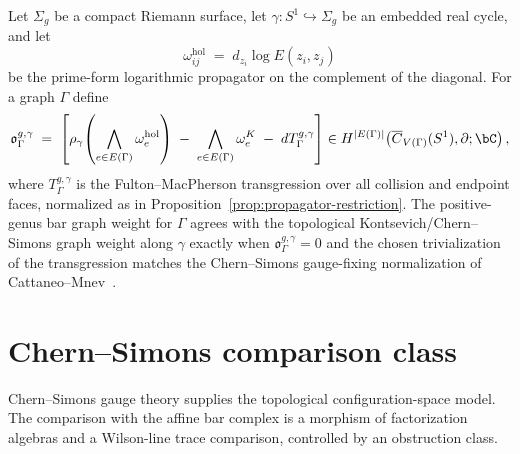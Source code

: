 \begin{definition}
\label{def:real-loop-obstruction}
\label{rem:holomorphic-to-topological}
Let $\Sigma_g$ be a compact Riemann surface, let
\(\gamma:S^1\hookrightarrow\Sigma_g\) be an embedded real cycle, and
let
\[
\omega^{\mathrm{hol}}_{ij}
\;=\;
d_{z_i}\log E(z_i,z_j)
\]
be the prime-form logarithmic propagator on the complement of the
diagonal.  For a graph $\Gamma$ define
\[
\mathfrak{o}^{g,\gamma}_\Gamma
\;=\;
\left[
\rho_\gamma\!\left(\bigwedge_{e\in E(\Gamma)}
\omega^{\mathrm{hol}}_e\right)
\;-\;
\bigwedge_{e\in E(\Gamma)}\omega^K_e
\;-\;dT^{g,\gamma}_\Gamma
\right]
\in
H^{|E(\Gamma)|}\!\left(
\overline{C}_{V(\Gamma)}(S^1),\partial;\bC\right),
\]
where $T^{g,\gamma}_\Gamma$ is the Fulton--MacPherson transgression
over all collision and endpoint faces, normalized as in
Proposition~\ref{prop:propagator-restriction}.  The positive-genus
bar graph weight for $\Gamma$ agrees with the topological
Kontsevich/Chern--Simons graph weight along $\gamma$ exactly when
\(\mathfrak{o}^{g,\gamma}_\Gamma=0\) and the chosen trivialization of
the transgression matches the Chern--Simons gauge-fixing
normalization of Cattaneo--Mnev~\cite{CattaneoMnev10}.
\end{definition}


\section{Chern--Simons comparison class}
\label{sec:cs-bridge}
Chern--Simons gauge theory supplies the topological configuration-space model.
The comparison with the affine bar complex is a morphism of factorization
algebras and a Wilson-line trace comparison, controlled by an obstruction class.

